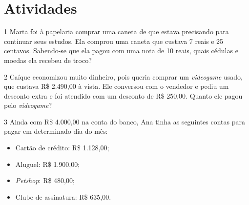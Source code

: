 
\section{Atividades}

\num{1} Marta foi à papelaria comprar uma caneta de que estava precisando para
continuar seus estudos. Ela comprou uma caneta que custava 7 reais e 25
centavos. Sabendo-se que ela pagou com uma nota de 10 reais, quais
cédulas e moedas ela recebeu de troco?


\num{2} Caíque economizou muito dinheiro, pois queria comprar um \textit{videogame} usado,
que custava R\$ 2.490,00 à vista. Ele conversou com o vendedor e pediu
um desconto extra e foi atendido com um desconto de R\$ 250,00. Quanto
ele pagou pelo \textit{videogame}?


\num{3} Ainda com R\$ 4.000,00 na conta do banco, Ana tinha as seguintes contas para pagar em determinado dia do mês:

\begin{mdframed}[linewidth=2pt,linecolor=azul!20,backgroundcolor=azul!20,roundcorner=2pt]
\begin{itemize}
  \item Cartão de crédito: R\$ 1.128,00;
  \item Aluguel: R\$ 1.900,00;
  \item \textit{Petshop}: R\$ 480,00;
  \item Clube de assinatura: R\$ 635,00.
\end{itemize}
\end{mdframed}

